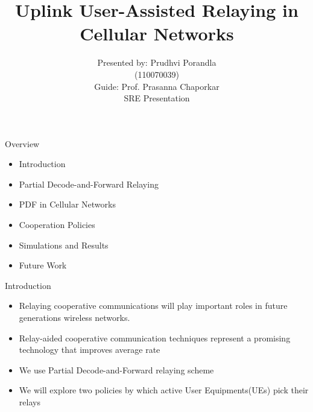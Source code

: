 \documentclass{beamer}
\title{Uplink User-Assisted Relaying in Cellular Networks}
\author{Presented by: Prudhvi Porandla \\ \quad (110070039)\\
\vspace{2mm}
Guide: Prof. Prasanna Chaporkar \\
\vspace{2mm}
SRE Presentation}
\begin{document}
\begin{frame}
  \titlepage
\end{frame}

\begin{frame}{Overview}
  \begin{itemize}
  \item Introduction
  \vspace{3mm}
  \item  Partial Decode-and-Forward Relaying
  \vspace{3mm}
  \item PDF in Cellular Networks
  \vspace{3mm}
  \item Cooperation Policies 
  \vspace{3mm}
  \item Simulations and Results
  \vspace{3mm}
  \item Future Work
  \end{itemize}
\end{frame}




\begin{frame}{Introduction}
  \begin{itemize}
  \item Relaying cooperative communications will play important roles in future generations wireless networks.
  \vspace{0.5cm}
  \item Relay-aided cooperative communication techniques represent a promising technology that improves average rate
  \vspace{0.5cm}
  \item We use Partial Decode-and-Forward relaying scheme 
  \vspace{0.5cm}
  \item We will explore two policies by which active User Equipments(UEs) pick their relays
  \end{itemize}
\end{frame}
\end{document}
